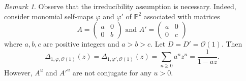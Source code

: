 \documentclass[11pt,a4paper]{article}
\theoremstyle{plain}
\theoremstyle{remark}
\newtheorem{remark}[theorem]{Remark}
\theoremstyle{custombold}
\begin{document}
\begin{remark}
    Observe that the irreducibility assumption is necessary. Indeed, consider monomial self-maps $\varphi$ and $\varphi'$ of $\mathbb P^2$ associated with matrices \[A=\begin{pmatrix}
        a&0\\0&b
    \end{pmatrix}\text{ and }A'=\begin{pmatrix}
        a&0\\0&c
    \end{pmatrix}\]
    where $a,b,c$ are positive integers and $a>b>c$. Let $D=D'=\mathcal{O}(1)$. Then \[\Delta_{1,\varphi,\mathcal{O}(1)}(z)=\Delta_{1,\varphi',\mathcal{O}(1)}(z)=\sum_{n\geq0}a^nz^n=\frac{1}{1-az}.\] However, $A^{u}$ and $A'^{u}$ are not conjugate for any $u>0$.
\end{remark}
\end{document}
